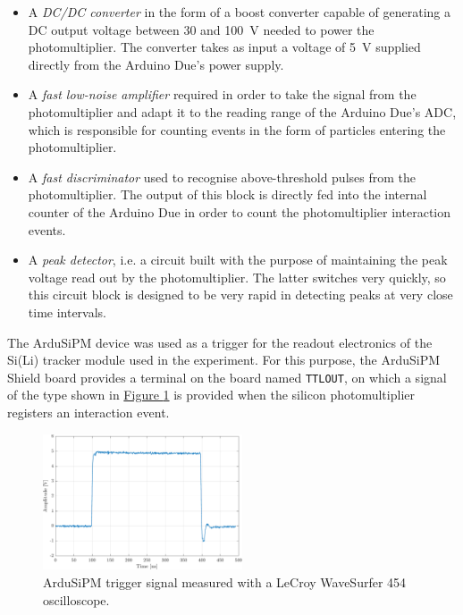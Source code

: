 \begin{itemize}
    \itemsep0em
    \item A \textit{DC/DC converter} in the form of a boost converter capable of generating a DC output voltage between 30 and \SI{100}{\volt} needed to power the photomultiplier. The converter takes as input a voltage of \SI{5}{\volt} supplied directly from the Arduino Due's power supply.
    \item A \textit{fast low-noise amplifier} required in order to take the signal from the photomultiplier and adapt it to the reading range of the Arduino Due's ADC, which is responsible for counting events in the form of particles entering the photomultiplier.
    \item A \textit{fast discriminator} used to recognise above-threshold pulses from the photomultiplier. The output of this block is directly fed into the internal counter of the Arduino Due in order to count the photomultiplier interaction events.
    \item A \textit{peak detector}, i.e. a circuit built with the purpose of maintaining the peak voltage read out by the photomultiplier. The latter switches very quickly, so this circuit block is designed to be very rapid in detecting peaks at very close time intervals.
\end{itemize}

\par
The ArduSiPM device was used as a trigger for the readout electronics of the Si(Li) tracker module used in the experiment. For this purpose, the ArduSiPM Shield board provides a terminal on the board named \texttt{TTLOUT}, on which a signal of the type shown in \hyperref[figArduiSiPMtrigger]{Figure \ref{figArduiSiPMtrigger}} is provided when the silicon photomultiplier registers an interaction event.

\begin{figure}[h!]
    \centering
    \includegraphics[width=0.525\textwidth]{Images/chap3/ArduSiPM_trigger.pdf}
    \caption{ArduSiPM trigger signal measured with a LeCroy WaveSurfer 454 oscilloscope.}
    \label{figArduiSiPMtrigger}
\end{figure}

